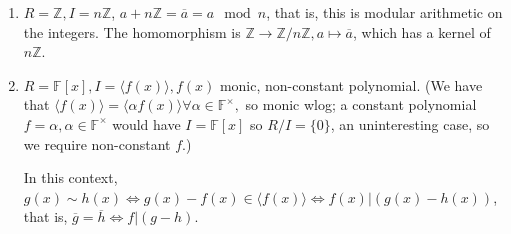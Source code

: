 \documentclass[12pt,oneside]{article}
\begin{document}
\begin{example}[Of $R/I$'s]
  \begin{enumerate}
    \item $R = \mathbb{Z}, I = n \mathbb{Z}$, $a + n \mathbb{Z} = \overline{a} = a \mod n$, that is, this is modular arithmetic on the integers. The homomorphism is $\mathbb{Z} \to \mathbb{Z}/n\mathbb{Z}, a \mapsto \overline{a}$, which has a kernel of $n \mathbb{Z}$.
    \item $R = \mathbb{F}[x], I = \langle f(x)\rangle, f(x)$ monic, non-constant polynomial. (We have that $ \langle f(x)\rangle =  \langle \alpha f(x)\rangle \forall \alpha \in \mathbb{F}^{\times},$ so monic wlog; a constant polynomial $f = \alpha, \alpha \in \mathbb{F}^{\times}$ would have $I = \mathbb{F}[x]$ so $R/I = \{0\}$, an uninteresting case, so we require non-constant $f$.)
    
    In this context, $g(x) \sim h(x) \iff g(x)-f(x) \in \langle f(x)\rangle \iff f(x) | (g(x)-h(x))$, that is, $\overline{g} = \overline{h} \iff f | (g-h)$.
  \end{enumerate}
\end{example}
\end{document}
